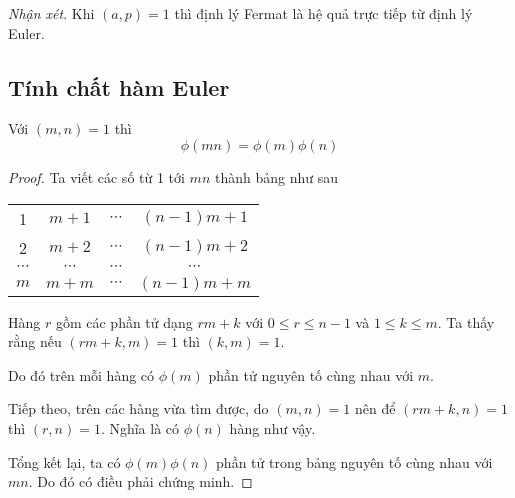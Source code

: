 \textit{Nhận xét}. Khi $(a, p) = 1$ thì định lý Fermat là hệ quả trực tiếp từ định lý Euler.

\subsection*{Tính chất hàm Euler}

\begin{remark}
    Với $(m, n) = 1$ thì $$\phi(m n) = \phi(m) \phi(n)$$
\end{remark}

\begin{proof}
    Ta viết các số từ 1 tới $mn$ thành bảng như sau

    \begin{center}
        \begin{tabular}{c c c c}
            1 & $m+1$ & $\cdots$ & $(n-1)m + 1$ \\
            2 & $m+2$ & $\cdots$ & $(n-1)m + 2$ \\
            $\cdots$ & $\cdots$ & $\cdots$ & $\cdots$ \\
            $m$ & $m+m$ & $\cdots$ & $(n-1)m + m$
        \end{tabular}
    \end{center}
    
    Hàng $r$ gồm các phần tử dạng $r m + k$ với $0 \leq r \leq n-1$ và $1 \leq k \leq m$. 
    Ta thấy rằng nếu $(rm + k, m) = 1$ thì $(k, m) = 1$.

    Do đó trên mỗi hàng có $\phi(m)$ phần tử nguyên tố cùng nhau với $m$.

    Tiếp theo, trên các hàng vừa tìm được, do $(m, n) = 1$ nên để $(rm + k, n) = 1$ thì $(r, n) = 1$.
    Nghĩa là có $\phi(n)$ hàng như vậy.

    Tổng kết lại, ta có $\phi(m) \phi(n)$ phần tử trong bảng nguyên tố cùng nhau với $mn$. Do đó có điều phải chứng minh.
\end{proof}

\newpage